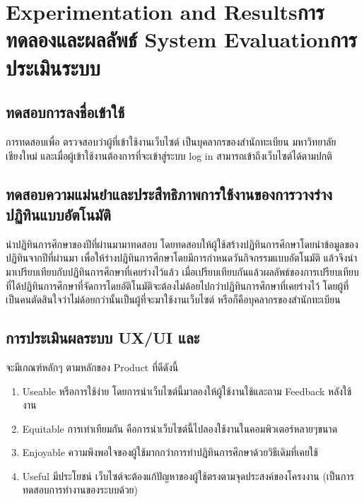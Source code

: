 \chapter{\ifproject%
\ifenglish Experimentation and Results\else การทดลองและผลลัพธ์\fi
\else%
\ifenglish System Evaluation\else การประเมินระบบ\fi
\fi}
\section{ทดสอบการลงชื่อเข้าใช้} 
   การทดสอบเพื่อ ตรวจสอบว่าผู้ที่เข้าใช้งานเว็บไซต์ เป็นบุคลากรของสำนักทะเบียน มหาวิทยาลัยเชียงใหม่ 
และเมื่อผู้เข้าใช้งานต้องการที่จะเข้าสู่ระบบ log in สามารถเข้าถึงเว็บไซต์ได้ตามปกติ

\section{ทดสอบความแม่นยำและประสืทธิภาพการใช้งานของการวางร่างปฏิทินแบบอัตโนมัติ}
   นำปฏิทินการศึกษาของปีที่ผ่านมามาทดสอบ โดยทดสอบให้ผู้ใช้สร้างปฏิทินการศึกษาโดยนำข้อมูลของปฏิทินจากปีที่ผ่านมา 
เพื่อให้ร่างปฏิทินการศึกษาโดยมีการกำหนดวันกิจกรรมแบบอัตโนมัติ แล้วจึงนำมาเปรียบเทียบกับปฏิทินการศึกษาที่เคยร่างไว้แล้ว 
เมื่อเปรียบเทียบกันแล้วผลลัพธ์ของการเปรียบเทียบที่ได้ปฏิทินการศึกษาที่จัดการโดยอัติโนมัติจะต้องไม่ด้อยไปกว่าปฏิทินการศึกษาที่เคยร่างไว้
โดยผู้ที่เป็นคนตัดสินใจว่าไม่ด้อยกว่านั้นเป็นผู้ที่จะมาใช้งานเว็บไซต์ หรือก็คือบุคลากรของสำนักทะเบียน

\section{การประเมินผลระบบ UX/UI และ} 
จะมีเกณฑ์หลักๆ ตามหลักของ Product ที่ดีดังนี้
\begin{enumerate}
   \item Useable หรือการใช้ง่าย โดยการนำเว็บไซต์นี้มาลองให้ผู้ใช้งานใช้และถาม Feedback หลังใช้งาน
   \item Equitable การเท่าเทียมกัน คือการนำเว็บไซต์นี้ไปลองใช้งานในคอมพิวเตอร์หลายๆขนาด
   \item Enjoyable ความพึงพอใจของผู้ใช้มากกว่าการทำปฏิทินการศึกษาด้วยวิธีเดิมที่เคยใช้
   \item Useful มีประโยชน์ เว็บไซต์จะต้องแก้ปัญหาของผู้ใช้ตรงตามจุดประสงค์ของโครงงาน (เป็นการทดสอบการทำงานของระบบด้วย)
\end{enumerate}

